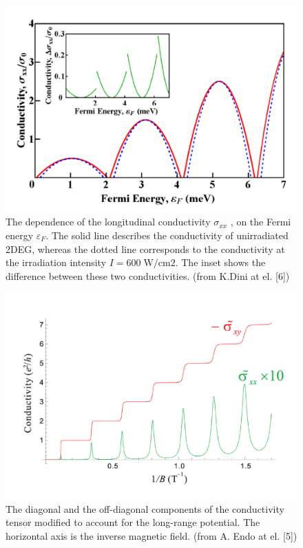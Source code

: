 \documentclass[a4paper]{article}
\numberwithin{equation}{subsection}
\numberwithin{equation}{section}
\begin{document}
\begin{figure}[ht!]
  \centering
  \includegraphics[scale=0.3]{figures/fig6.pdf}
  \caption{The dependence of the longitudinal conductivity $\sigma_{xx}$ , on
the Fermi energy $\varepsilon_F$. The solid line describes the conductivity
of unirradiated 2DEG, whereas the dotted line corresponds to the
conductivity at the irradiation intensity $I = 600 \; \text{W/cm2}$. The inset
shows the difference between these two conductivities. (from K.Dini at el. [6])}
  \label{fig:6}
\end{figure}

\newpage
\begin{figure}[ht!]
  \centering
  \includegraphics[scale=0.3]{figures/fig7.pdf}
  \caption{The diagonal and the off-diagonal components
of the conductivity tensor modified to account for the long-range potential. The
horizontal axis is the inverse magnetic field. (from A. Endo at el. [5])}
  \label{fig:7}
\end{figure}
\end{document}
